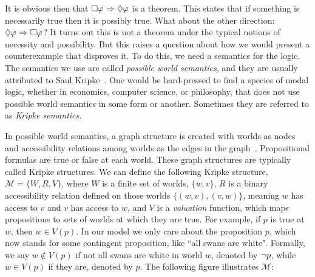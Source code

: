 
It is obvious then that $\Box \varphi {\ \Rightarrow \ } \Diamond \varphi$ is a theorem. This states that if something is necessarily true then it is possibly true. What about the other direction: $\Diamond \varphi {\ \Rightarrow \ } \Box \varphi$? It turns out this is not a theorem under the typical notions of necessity and possibility. But this raises a question about how we would present a counterexample that disproves it. To do this, we need a semantics for the logic. The semantics we use are called \emph{possible world semantics}, and they are usually attributed to Saul Kripke~\cite{Kripke}. One would be hard-pressed to find a species of modal logic, whether in economics, computer science, or philosophy, that does not use possible world semantics in some form or another. Sometimes they are referred to as \emph{Kripke semantics}.

In possible world semantics, a graph structure is created with worlds as nodes and accessibility relations among worlds as the edges in the graph~\cite{modal}. Propositional formulas are true or false at each world. These graph structures are typically called Kripke structures. We can define the following Kripke structure, $\mathcal{M} = \{W, R, V\}$, where $W$ is a finite set of worlds, $\{w, v\}$, $R$ is a binary accessibility relation defined on those worlds $\{(w,v), (v,w)\}$, meaning $w$ has access to $v$ and $v$ has access to $w$, and $V$ is a \emph{valuation} function, which maps propositions to sets of worlds at which they are true. For example, if $p$ is true at $w$, then $w \in V(p)$. In our model we only care about the proposition $p$, which now stands for some contingent proposition, like ``all swans are white". Formally, we say $w \not\in V(p)$ if not all swans are white in world $w$, denoted by ${\neg} p$, while $w \in V(p)$ if they are, denoted by $p$. The following figure illustrates $\mathcal{M}$:

